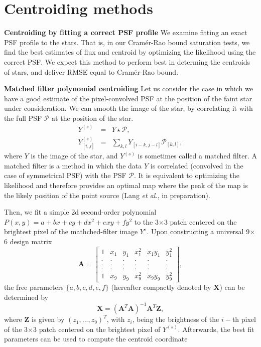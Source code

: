 \documentclass[12pt, preprint]{aastex}
\newcommand{\beq}{\begin{equation}}
\newcommand{\eeq}{\end{equation}}
\begin{document}
\section{Centroiding methods}\label{sec:method}
\begin{description}

\item{{\bf Centroiding by fitting a correct PSF profile}} \quad We examine fitting an exact PSF 
profile to the stars. That is, 
in our Cram\'{e}r-Rao bound saturation tests, we find the best
estimates of flux and centroid by optimizing the likelihood using 
the correct PSF. We expect this method to perform best in determing the centroids
of stars, and deliver RMSE equal to Cram\'{e}r-Rao bound.

\item{{\bf Matched filter polynomial centroiding}} \quad Let us consider the case 
in which we have a good estimate of the pixel-convolved PSF at
the position of the faint star under consideration. 
We can smooth the image of the star, by correlating it with the 
full PSF $\mathcal{P}$ at the position of the star.
\begin{eqnarray}
Y^{(s)} &=& Y \star \mathcal{P}, \\
Y^{(s)}_{[i,j]} &=& \sum_{k,l}Y_{[i-k,j-l]}\mathcal{P}_{[k,l]},
\end{eqnarray}
where $Y$ is the image of the star, and $Y^{(s)}$ is sometimes called a matched filter. 
A matched filter is a method in which the data $Y$ is correlated (convolved in the 
case of symmetrical PSF) with the PSF $\mathcal{P}$. It is equivalent to optimizing the 
likelihood and therefore provides an optimal map 
where the peak of the map is the likely position of the 
point source (Lang \emph{et al.}, in preparation).

Then, we fit a simple 2d second-order polynomial 
$P(x,y)=a+bx+cy+dx^2+exy+fy^2$ 
to the 3$\times$3 patch centered on the brightest pixel of the
mathched-filter image $Y^{s}$.
Upon constructing a universal 9$\times$6 design matrix
\begin{equation}
    \mathbf{A} = 
    \begin{bmatrix}
        1 & x_{1} & y_{1} & x_{1}^{2} & x_{1}y_{1} & y_{1}^{2} \\
        . & . & . & . & . & .  \\
        . & . & . & . & . & .  \\
        . & . & . & . & . & .  \\
        1 & x_{9} & y_{9} & x_{9}^{2} & x_{9}y_{9} & y_{9}^{2}
    \end{bmatrix},
\end{equation}
the free parameters $\{a,b,c,d,e,f\}$
(hereafter compactly denoted by $\mathbf{X}$) can be determined by 
\beq
\mathbf{X} = (\mathbf{A}^{T}\mathbf{A})^{-1}\mathbf{A}^{T}\mathbf{Z},
\label{linearfit}
\eeq
where $\mathbf{Z}$ is given by $(z_{1},...,z_{9})^{T}$,
with $z_{i}$, being the brightness of the $i-$th pixel of the 3$\times$3 patch centered on the brightest pixel of $Y^{(s)}$.
Afterwards, the best fit parameters can be used to compute the centroid coordinate


\end{description}
\end{document}
